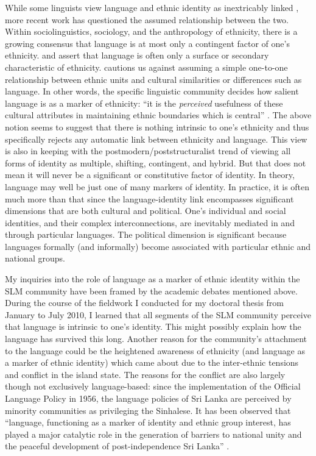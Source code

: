 While some linguists view language and ethnic identity as inextricably linked \citep{Fishman1991,Joseph2004,Pozzetta1991}, more recent work has questioned the assumed relationship between the two. Within sociolinguistics, sociology, and the anthropology of ethnicity, there is a growing consensus that language is at most only a contingent factor of one's ethnicity. \citet{Edwards1985,Edwards1994,Edwards2001} and \citet{Eastman1984} assert that language is often only a surface or secondary characteristic of ethnicity. \citet{Barth1969} cautions us against assuming a simple one-to-one relationship between ethnic units and cultural similarities or differences such as language. In other words, the specific linguistic community decides how salient language is as a marker of ethnicity: ``it is the \textit{perceived} usefulness of these cultural attributes in maintaining ethnic boundaries which is central'' \citep[40]{May2004}. The above notion seems to suggest that there is nothing intrinsic to one's ethnicity and thus specifically rejects any automatic link between ethnicity and language. This view is also in keeping with the postmodern/poststructuralist trend of viewing all forms of identity as multiple, shifting, contingent, and hybrid. But that does not mean it will never be a significant or constitutive factor of identity. In theory, language may well be just one of many markers of identity. In practice, it is often much more than that since the language-identity link encompasses significant dimensions that are both cultural and political. One's individual and social identities, and their complex interconnections, are inevitably mediated in and through particular languages. The political dimension is significant because languages formally (and informally) become associated with particular ethnic and national groups. 

My inquiries into the role of language as a marker of ethnic identity within the SLM community have been framed by the academic debates mentioned above. During the course of the fieldwork I conducted for my doctoral thesis from January to July 2010, I learned that all segments of the SLM community perceive that language is intrinsic to one's identity. This might possibly explain how the language has survived this long. Another reason for the community's attachment to the language could be the heightened awareness of ethnicity (and language as a marker of ethnic identity) which came about due to the inter-ethnic tensions and conflict in the island state. The reasons for the conflict are also largely though not exclusively language-based: since the implementation of the Official Language Policy in 1956, the language policies of Sri Lanka are perceived by minority communities as privileging the Sinhalese.  It has been observed that ``language, functioning as a marker of identity and ethnic group interest, has played a major catalytic role in the generation of barriers to national unity and the peaceful development of post-independence Sri Lanka'' \citep[116]{Dharmadasa2007}. 

